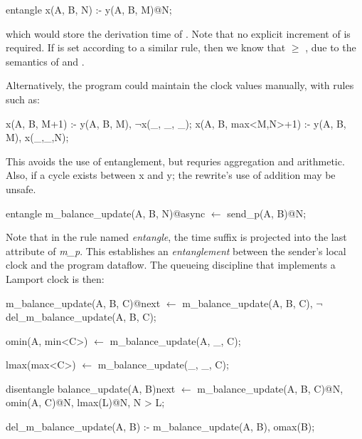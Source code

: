 \begin{Dedalus}
entangle
x(A, B, N) :- y(A, B, M)@N;
\end{Dedalus}

which would store the derivation time of .  Note that no explicit
increment of  is required.  If  is set according to a similar
rule, then we know that  $\ge$ , due to the semantics of
 and .

Alternatively, the program could maintain the clock values manually,
with rules such as:

\begin{Dedalus}
x(A, B, M+1) :- y(A, B, M), \(\neg\)x(_, _, _);
x(A, B, max<M,N>+1) :- y(A, B, M), x(_,_,N); 
\end{Dedalus}

This avoids the use of entanglement, but requries aggregation and
arithmetic.  Also, if a cycle exists between x and y; the rewrite's
use of addition may be unsafe.


\begin{Dedalus}
entangle
m\_balance\_update(A, B, N)@async \(\leftarrow\)
  send\_p(A, B)@N;
\end{Dedalus}

Note that in the rule named \emph{entangle}, the time suffix is projected into the last attribute of \emph{m\_p}.  
This establishes an \emph{entanglement} between
the sender's local clock and the program dataflow.  The queueing discipline that implements a
Lamport clock is then:

\begin{Dedalus}

m\_balance\_update(A, B, C)@next \(\leftarrow\)
  m\_balance\_update(A, B, C),
  \(\lnot\) del\_m\_balance\_update(A, B, C);

omin(A, min<C>) \(\leftarrow\)
  m\_balance\_update(A, _, C);

lmax(max<C>) \(\leftarrow\)
  m\_balance\_update(_, _, C);

disentangle
balance_update(A, B)next \(\leftarrow\)
  m\_balance\_update(A, B, C)@N,
  omin(A, C)@N,
  lmax(L)@N,
  N > L;

del\_m\_balance\_update(A, B) :-
  m\_balance\_update(A, B),
  omax(B);
  
\end{Dedalus}

